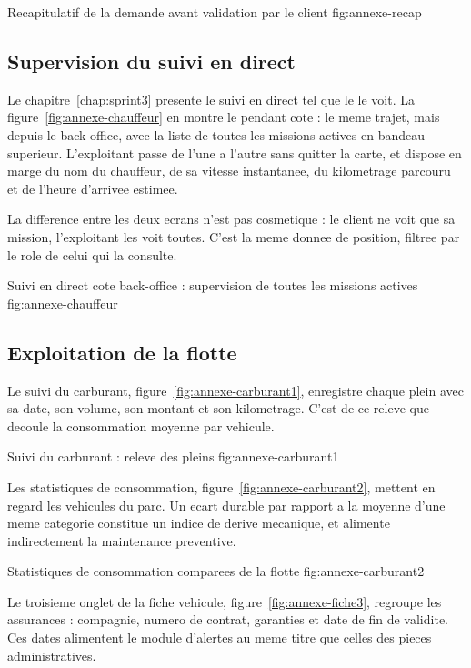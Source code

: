   {Recapitulatif de la demande avant validation par le client}
  {fig:annexe-recap}

\subsection*{Supervision du suivi en direct}

Le chapitre~\ref{chap:sprint3} presente le suivi en direct tel que le
 le voit. La figure~\ref{fig:annexe-chauffeur} en montre
le pendant cote  : le meme trajet, mais depuis le
back-office, avec la liste de toutes les missions actives en bandeau
superieur. L'exploitant passe de l'une a l'autre sans quitter la carte,
et dispose en marge du nom du chauffeur, de sa vitesse instantanee, du
kilometrage parcouru et de l'heure d'arrivee estimee.

La difference entre les deux ecrans n'est pas cosmetique : le client ne
voit que sa mission, l'exploitant les voit toutes. C'est la meme donnee de
position, filtree par le role de celui qui la consulte.

  {Suivi en direct cote back-office : supervision de toutes les missions
   actives}
  {fig:annexe-chauffeur}

\subsection*{Exploitation de la flotte}

Le suivi du carburant, figure~\ref{fig:annexe-carburant1}, enregistre
chaque plein avec sa date, son volume, son montant et son kilometrage.
C'est de ce releve que decoule la consommation moyenne par vehicule.

  {Suivi du carburant : releve des pleins}
  {fig:annexe-carburant1}

Les statistiques de consommation, figure~\ref{fig:annexe-carburant2},
mettent en regard les vehicules du parc. Un ecart durable par rapport a la
moyenne d'une meme categorie constitue un indice de derive mecanique, et
alimente indirectement la maintenance preventive.

  {Statistiques de consommation comparees de la flotte}
  {fig:annexe-carburant2}

Le troisieme onglet de la fiche vehicule, figure~\ref{fig:annexe-fiche3},
regroupe les assurances : compagnie, numero de contrat, garanties et date
de fin de validite. Ces dates alimentent le module d'alertes au meme titre
que celles des pieces administratives.

